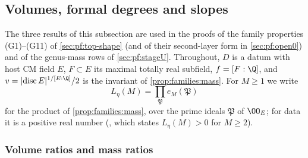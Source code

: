 \subsection{Volumes, formal degrees and slopes}\label{sec:pf:sh-curv:vol}

The three results of this subsection are used in the proofs of the family properties (G1)--(G11) of
\cref{sec:pf:top-shape} (and of their second-layer form in \cref{sec:pf:open0}) and of the genus-mass rows of
\cref{sec:pf:stageU}. Throughout, $D$ is a datum with host CM
field $E$, $F\subset E$ its maximal totally real subfield, $f=[F:\Q]$, and
$v=|\mathrm{disc}\,E|^{1/[E:\Q]}/2$ is the invariant of \cref{prop:families:mass}. For $M\ge1$ we write
\[
L_\eta(M)=\prod_{\mathfrak P}e_M(\mathfrak P)
\]
for the product of \cref{prop:families:mass}, over the prime ideals $\mathfrak P$ of $\OO_E$; for data it is a
positive real number (, which states $L_\eta(M)>0$ for $M\ge2$).

\subsubsection{Volume ratios and mass ratios}

